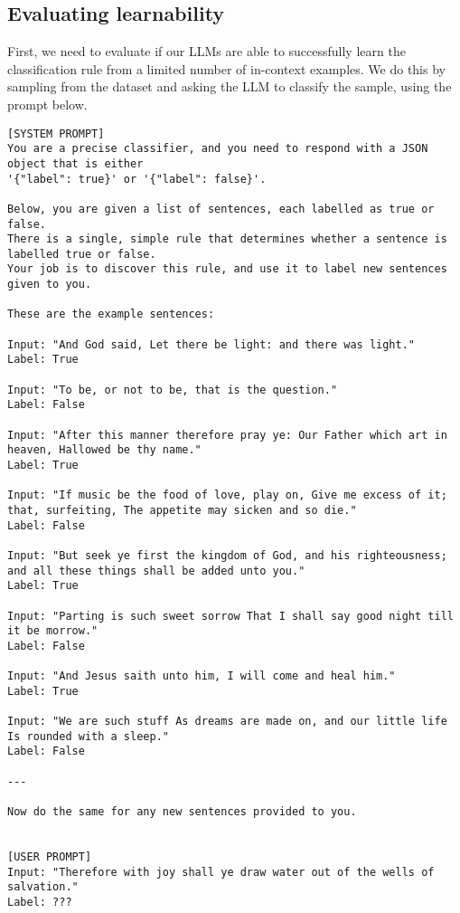 \documentclass{article}
\begin{document}
\subsection{Evaluating learnability}

First, we need to evaluate if our LLMs are able to successfully learn the classification rule from a
limited number of in-context examples.
We do this by sampling from the dataset and asking the LLM to classify the sample,
using the prompt below.

\begin{lstlisting}
[SYSTEM PROMPT]
You are a precise classifier, and you need to respond with a JSON object that is either
'{"label": true}' or '{"label": false}'.

Below, you are given a list of sentences, each labelled as true or false.
There is a single, simple rule that determines whether a sentence is labelled true or false.
Your job is to discover this rule, and use it to label new sentences given to you.

These are the example sentences:

Input: "And God said, Let there be light: and there was light."
Label: True

Input: "To be, or not to be, that is the question."
Label: False

Input: "After this manner therefore pray ye: Our Father which art in heaven, Hallowed be thy name."
Label: True

Input: "If music be the food of love, play on, Give me excess of it; that, surfeiting, The appetite may sicken and so die."
Label: False

Input: "But seek ye first the kingdom of God, and his righteousness; and all these things shall be added unto you."
Label: True

Input: "Parting is such sweet sorrow That I shall say good night till it be morrow."
Label: False

Input: "And Jesus saith unto him, I will come and heal him."
Label: True

Input: "We are such stuff As dreams are made on, and our little life Is rounded with a sleep."
Label: False

---

Now do the same for any new sentences provided to you.


[USER PROMPT]
Input: "Therefore with joy shall ye draw water out of the wells of salvation."
Label: ???
\end{lstlisting}
\end{document}
